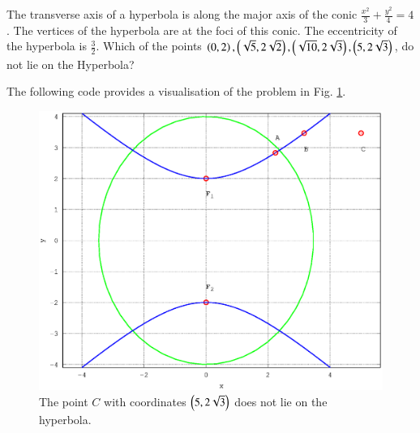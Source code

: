 \documentclass[journal,12pt,twocolumn]{IEEEtran}
\begin{document}
%
\begin{problem}
The transverse axis of a hyperbola is along the major axis of the conic $\frac{x^2}{3}+ \frac{y^2}{4} = 4$. The vertices of the hyperbola are at the foci of this conic. The eccentricity of the hyperbola is $\frac{3}{2}$. Which of the points $\left(0,2\right),\left(\sqrt{5},2\sqrt{2}\right),\left(\sqrt{10},2\sqrt{3}\right),\left(5, 2\sqrt{3}\right)$, do not lie on the Hyperbola?
\end{problem}
\solution

The following code provides a visualisation of the problem in Fig. \ref{fig_24}.

%
\begin{figure}[h]
\centering
\includegraphics[width=\columnwidth]{./figs/ee16b1024}
\caption{ The point $C$ with coordinates $\left(5, 2\sqrt{3}\right)$ does not lie on the hyperbola.}
\label{fig_24}	
\end{figure}
%
\end{document}
